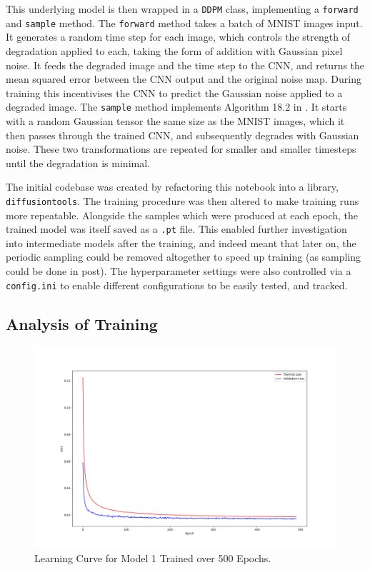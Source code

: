 \documentclass[12pt]{article}
\begin{document}
This underlying model is then wrapped in a \texttt{DDPM} class, implementing a \texttt{forward} and \texttt{sample} method.
The \texttt{forward} method takes a batch of MNIST images input.
It generates a random time step for each image, which controls the strength of degradation applied to each,
taking the form of addition with Gaussian pixel noise.
It feeds the degraded image and the time step to the CNN, and returns the mean squared error between the CNN output and the original noise map.
During training this incentivises the CNN to predict the Gaussian noise applied to a degraded image.
The \texttt{sample} method implements Algorithm 18.2 in \cite{prince2023understanding}.
It starts with a random Gaussian tensor the same size as the MNIST images, which it then passes through the trained CNN,
and subsequently degrades with Gaussian noise.
These two transformations are repeated for smaller and smaller timesteps until the degradation is minimal.

The initial codebase was created by refactoring this notebook into a library, \texttt{diffusiontools}.
The training procedure was then altered to make training runs more repeatable.
Alongside the samples which were produced at each epoch, the trained model was itself saved as a \texttt{.pt} file.
This enabled further investigation into intermediate models after the training, and indeed meant that later on,
the periodic sampling could be removed altogether to speed up training (as sampling could be done in post).
The hyperparameter settings were also controlled via a \texttt{config.ini} to enable different configurations to be easily tested, and tracked.

\subsection{Analysis of Training}

\begin{figure}[hp]
    \includegraphics[scale=0.35, center]{figures/learning_curve_1.png}
    \caption{Learning Curve for Model 1 Trained over 500 Epochs.}
    \label{fig:learning_curve_1}
\end{figure}
\end{document}
